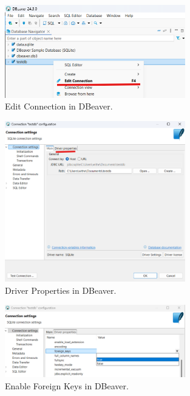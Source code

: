 \documentclass[a4paper,11pt,oneside]{article}
\begin{document}
\begin{sloppypar}
\begin{figure}[!htb]
  \centering
  \includegraphics[width=0.7\textwidth]{dbeaver/edit_connection.png}
  \caption{Edit Connection in DBeaver.}
  \label{fig:edit_connection}
\end{figure}

\begin{figure}[!htb]
  \centering
  \includegraphics[width=0.7\textwidth]{dbeaver/edit_driver_properties.png}
  \caption{Driver Properties in DBeaver.}
  \label{fig:edit_driver_properties}
\end{figure}

\begin{figure}[!htb]
  \centering
  \includegraphics[width=0.7\textwidth]{dbeaver/edit_foreign_keys_enable.png}
  \caption{Enable Foreign Keys in DBeaver.}
  \label{fig:edit_foreign_keys_enable}
\end{figure}



\end{sloppypar}
\end{document}
